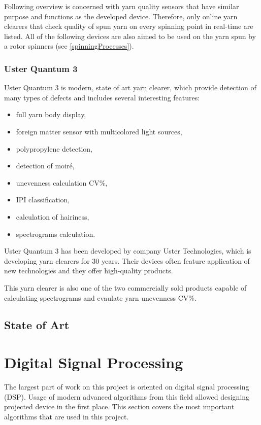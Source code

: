 \documentclass[twoside]{ctuthesis}
\theoremstyle{plain}
\theoremstyle{definition}
\theoremstyle{note}
\begin{document}
Following overview is concerned with yarn quality sensors that have similar purpose and functions as the developed device. Therefore, only online yarn clearers that check quality of spun yarn on every spinning point in real-time are listed. All of the following devices are also aimed to be used on the yarn spun by a rotor spinners (see \ref{spinningProcesses}).

\subsubsection{Uster Quantum 3}
Uster Quantum 3 is modern, state of art yarn clearer, which provide detection of many types of defects and includes several interesting features:

\begin{itemize}
	\setlength{\itemsep}{5pt}
	\item full yarn body display,
	\item foreign matter sensor with multicolored light sources,
	\item polypropylene detection,
	\item detection of moiré,
	\item unevenness calculation CV\%,
	\item IPI classification,
	\item calculation of hairiness,
	\item spectrograms calculation.
\end{itemize}

Uster Quantum 3 has been developed by company Uster Technologies, which is developing yarn clearers for 30 years. Their devices often feature application of new technologies and they offer high-quality products.

This yarn clearer is also one of the two commercially sold products capable of calculating spectrograms and evaulate yarn unevenness CV\%.

 
\subsection{State of Art}

\section{Digital Signal Processing}
The largest part of work on this project is oriented on digital signal processing (DSP). Usage of modern advanced algorithms from this field allowed designing projected device in the first place. This section covers the most important algorithms that are used in this project.
	
\end{document}

